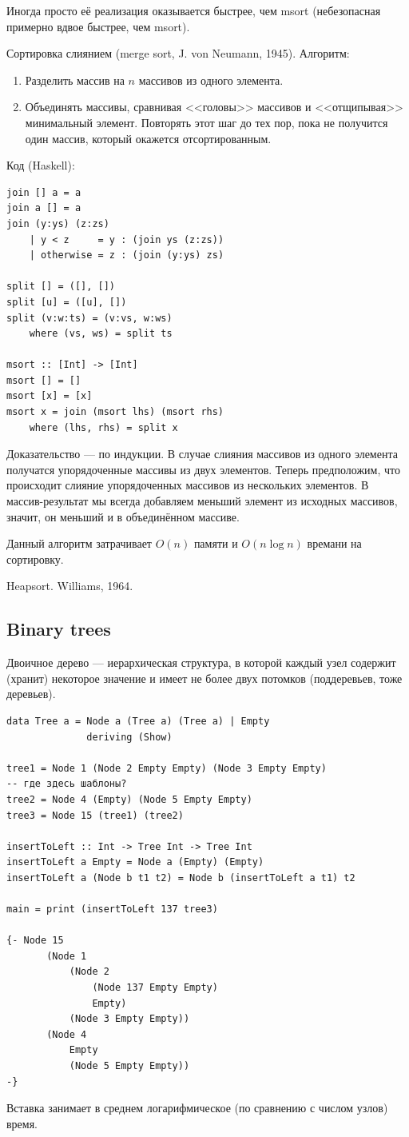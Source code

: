 \documentclass{book}
\begin{document}
Иногда просто её реализация оказывается
быстрее, чем msort (небезопасная примерно вдвое быстрее, чем msort).

Сортировка слиянием (merge sort, J. von Neumann, 1945). Алгоритм:
\begin{enumerate}
  \item Разделить массив на $n$ массивов из одного элемента.
  \item Объединять массивы, сравнивая <<головы>> массивов и <<отщипывая>>
    минимальный элемент. Повторять этот шаг до тех пор, пока не получится один
    массив, который окажется отсортированным.
\end{enumerate}
Код (Haskell):
\begin{verbatim}
join [] a = a
join a [] = a
join (y:ys) (z:zs)
    | y < z     = y : (join ys (z:zs))
    | otherwise = z : (join (y:ys) zs)

split [] = ([], [])
split [u] = ([u], [])
split (v:w:ts) = (v:vs, w:ws)
    where (vs, ws) = split ts

msort :: [Int] -> [Int]
msort [] = []
msort [x] = [x]
msort x = join (msort lhs) (msort rhs)
    where (lhs, rhs) = split x
\end{verbatim}
Доказательство --- по индукции. В случае слияния массивов из одного элемента
получатся упорядоченные массивы из двух элементов. Теперь предположим, что
происходит слияние упорядоченных массивов из нескольких элементов. В
массив-результат мы всегда добавляем меньший элемент из исходных массивов,
значит, он меньший и в объединённом массиве.

Данный алгоритм затрачивает $O(n)$ памяти и $O(n\log n)$ времани на сортировку.

Heapsort. Williams, 1964.


\subsection{Binary trees}

Двоичное дерево --- иерархическая структура, в которой каждый узел содержит (хранит) некоторое
значение и имеет не более двух потомков (поддеревьев, тоже деревьев).
\begin{verbatim}
data Tree a = Node a (Tree a) (Tree a) | Empty
              deriving (Show)

tree1 = Node 1 (Node 2 Empty Empty) (Node 3 Empty Empty)
-- где здесь шаблоны?
tree2 = Node 4 (Empty) (Node 5 Empty Empty)
tree3 = Node 15 (tree1) (tree2)

insertToLeft :: Int -> Tree Int -> Tree Int
insertToLeft a Empty = Node a (Empty) (Empty)
insertToLeft a (Node b t1 t2) = Node b (insertToLeft a t1) t2

main = print (insertToLeft 137 tree3)

{- Node 15
       (Node 1
           (Node 2
               (Node 137 Empty Empty)
               Empty)
           (Node 3 Empty Empty))
       (Node 4
           Empty
           (Node 5 Empty Empty))
-}
\end{verbatim}
Вставка занимает в среднем логарифмическое (по сравнению с числом узлов) время.
\end{document}
